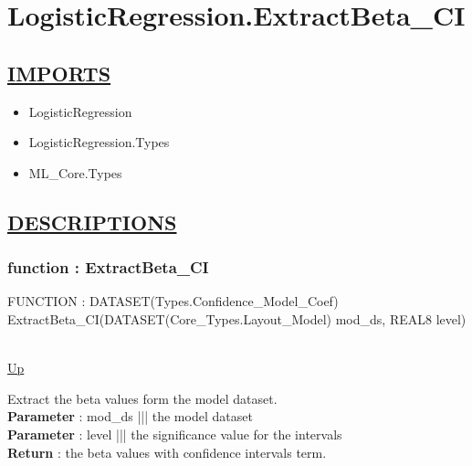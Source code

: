 \chapter*{LogisticRegression.ExtractBeta\_CI}
\hypertarget{LogisticRegression.ExtractBeta_CI}{}

\section*{\underline{IMPORTS}}
\begin{itemize}
\item LogisticRegression
\item LogisticRegression.Types
\item ML\_Core.Types
\end{itemize}

\section*{\underline{DESCRIPTIONS}}
\subsection*{function : ExtractBeta\_CI}
\hypertarget{ecldoc:logisticregression.extractbeta_ci}{FUNCTION : DATASET(Types.Confidence\_Model\_Coef) ExtractBeta\_CI(DATASET(Core\_Types.Layout\_Model) mod\_ds, REAL8 level)} \\
\hyperlink{ecldoc:}{Up} \\
\par
Extract the beta values form the model dataset. \\
\textbf{Parameter} : mod\_ds ||| the model dataset \\
\textbf{Parameter} : level ||| the significance value for the intervals \\
\textbf{Return} : the beta values with confidence intervals term. \\
